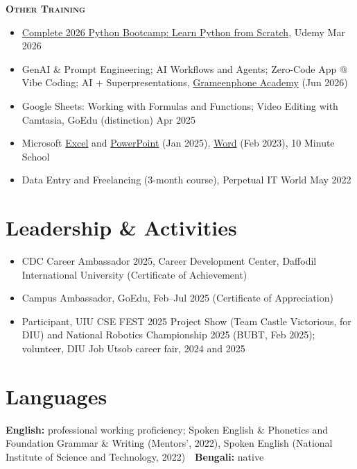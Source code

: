 \documentclass[10pt, letterpaper]{article}
\newcommand{\subhead}[1]{%
    {\small\bfseries\scshape #1}\par\vspace{1pt}%
}
\begin{document}
\vspace{2pt}
\subhead{Other Training}
\begin{itemize}[topsep=0pt]
    \item \href{https://ude.my/UC-f0d7f8c6-6825-4c0c-990d-250c439679bb}{Complete 2026 Python Bootcamp: Learn
          Python from Scratch}, Udemy \hfill {\small Mar 2026}
    \item GenAI \& Prompt Engineering; AI Workflows and Agents; Zero-Code App @ Vibe Coding; AI +
          Superpresentations, \href{https://www.grameenphone.academy/}{Grameenphone Academy} (Jun 2026)
    \item Google Sheets: Working with Formulas and Functions; Video Editing with Camtasia, GoEdu (distinction)
          \hfill {\small Apr 2025}
    \item Microsoft \href{https://10minuteschool.com/certificate/67863ee3542fd}{Excel} and
          \href{https://10minuteschool.com/certificate/67766165a0740}{PowerPoint} (Jan 2025),
          \href{https://10minuteschool.com/certificate/63f48949a08d0}{Word} (Feb 2023), 10 Minute School
    \item Data Entry and Freelancing (3-month course), Perpetual IT World \hfill {\small May 2022}
\end{itemize}

\section{Leadership \& Activities}

\begin{itemize}
    \item CDC Career Ambassador 2025, Career Development Center, Daffodil International University
          (Certificate of Achievement)
    \item Campus Ambassador, GoEdu, Feb--Jul 2025 (Certificate of Appreciation)
    \item Participant, UIU CSE FEST 2025 Project Show (Team Castle Victorious, for DIU) and National Robotics
          Championship 2025 (BUBT, Feb 2025); volunteer, DIU Job Utsob career fair, 2024 and 2025
\end{itemize}

\section{Languages}

\textbf{English:} professional working proficiency; Spoken English \& Phonetics and Foundation Grammar \&
Writing (Mentors', 2022), Spoken English (National Institute of Science and Technology, 2022)
\,\textbar\, \textbf{Bengali:} native
\end{document}
